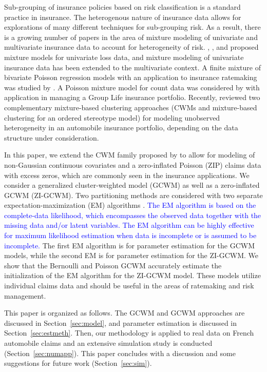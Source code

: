 \documentclass[11pt,letterpaper]{article}
\numberwithin{equation}{section}
\numberwithin{equation}{section}
\numberwithin{equation}{section}
\begin{document}
Sub-grouping of insurance policies based on risk classification is a standard practice in insurance. The heterogenous nature of insurance data allows for explorations of many different techniques for sub-grouping risk. As a result, there is a growing number of papers in the area of mixture modeling of univariate and multivariate insurance data to account for heterogeneity of risk. \cite{Lee+Lin:2010}, \cite{Verbelen+Gong+Antonio+Badescu+Lin:2015}, and \cite{Miljkovic+Grun:2016} proposed mixture models for univariate loss data, and mixture modeling of univariate insurance data has been extended to the multivariate context. A finite mixture of bivariate Poisson regression models with an application to insurance ratemaking was studied by \cite{Bermudez+Karlis:2012}. A Poisson mixture model for count data was considered by \cite{Brown+Buckley:2015} with application in managing a Group Life insurance portfolio. Recently, \cite{risks_miljkovic} reviewed two complementary mixture-based clustering approaches (CWMs and mixture-based clustering for an ordered stereotype model) for modeling unobserved heterogeneity in an automobile insurance portfolio, depending on the data structure under consideration. 

In this paper, we extend the CWM family proposed by \cite{Ingrassia+Punzo+Vittadini+Minotti:2015} to allow for modeling of non-Gaussian continuous covariates and a zero-inflated Poisson (ZIP) claims data with excess zeros, which are commonly seen in the insurance applications. We consider a generalized cluster-weighted model (GCWM) as well as a zero-inflated GCWM (ZI-GCWM). Two partitioning methods are considered with two separate expectation-maximization (EM) algorithms \citep{Dempster+Laird+Rubin:1977}. \textcolor{blue} {The EM algorithm is based on the complete-data likelihood, which encompasses the observed data together with the missing data and/or latent variables. The EM algorithm can be highly effective for maximum likelihood estimation when data is incomplete or is assumed to be incomplete.} The first EM algorithm is for parameter estimation for the GCWM models, while the second EM is for parameter estimation for the ZI-GCWM. We show that the Bernoulli and Poisson GCWM accurately estimate the initialization of the EM algorithm for the ZI-GCWM model. These models utilize individual claims data and should be useful in the areas of ratemaking and risk management.

This paper is organized as follows. The GCWM and GCWM approaches are discussed in Section~\ref{sec:model}, and parameter estimation is discussed in Section~\ref{sec:estmeth}. Then, our methodology is applied to real data on French automobile claims and an extensive simulation study is conducted (Section~\ref{sec:numapp}). This paper concludes with a discussion and some suggestions for future work (Section~\ref{sec:sim}).
\end{document}
